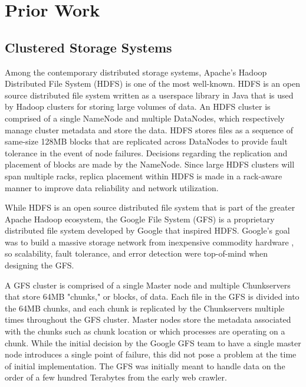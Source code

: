 \documentclass[12pt]{article}
\begin{document}
\section{Prior Work}

  \subsection{Clustered Storage Systems}

  Among the contemporary distributed storage systems, Apache's Hadoop
  Distributed File System (HDFS) \cite{hadoop} \cite{hdfs2008} is one of the
  most well-known. HDFS is an open source distributed file system written as a
  userspace library in Java that is used by Hadoop clusters for storing large
  volumes of data. An HDFS cluster is comprised of a single NameNode and
  multiple DataNodes, which respectively manage cluster metadata and store the
  data. HDFS stores files as a sequence of same-size 128MB blocks that are
  replicated across DataNodes to provide fault tolerance in the event of node
  failures. Decisions regarding the replication and placement of blocks 
  are made by the NameNode.  Since large HDFS clusters will span multiple
  racks, replica placement within HDFS is made in a rack-aware manner to
  improve data reliability and network utilization.

  While HDFS is an open source distributed file system that is part of the
  greater Apache Hadoop ecosystem, the Google File System (GFS) \cite{gfs} is a
  proprietary distributed file system developed by Google that inspired HDFS.
  Google's goal was to build a massive storage network from inexpensive
  commodity hardware \cite{gfs-interview}, so scalability, fault tolerance, and
  error detection were top-of-mind when designing the GFS.

  A GFS cluster is comprised of a single Master node and multiple Chunkservers
  that store 64MB "chunks," or blocks, of data. Each file in the GFS is divided
  into the 64MB chunks, and each chunk is replicated by the Chunkservers
  multiple times throughout the GFS cluster. Master nodes store the metadata
  associated with the chunks such as chunk location or which processes are
  operating on a chunk. While the initial decision by the Google GFS team to
  have a single master node introduces a single point of failure, this did not
  pose a problem at the time of initial implementation. The GFS was initially
  meant to handle data on the order of a few hundred Terabytes from the early
  web crawler.
\end{document}
